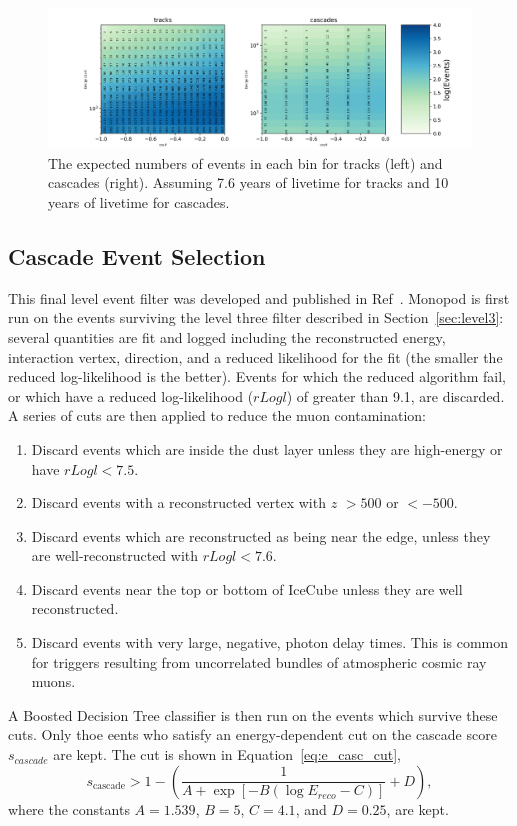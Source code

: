 \documentclass[main.tex]{subfiles}
\begin{document}
\begin{figure}
    \centering
    \includegraphics[width=0.8\linewidth]{figures/realization_joint.png}
    \caption{The expected numbers of events in each bin for tracks (left) and cascades (right). Assuming 7.6 years of livetime for tracks and 10 years of livetime for cascades.}\label{fig:event_no}
\end{figure}

\subsection{Cascade Event Selection}

This final level event filter was developed and published in Ref~\cite{2018PhDT17N}.
Monopod is first run on the events surviving the level three filter described in Section~\ref{sec:level3}:
several quantities are fit and logged including the reconstructed energy, interaction vertex, direction, and a reduced likelihood for the fit (the smaller the reduced log-likelihood is the better).
Events for which the reduced algorithm fail, or which have a reduced log-likelihood ($rLogl$) of greater than 9.1, are discarded. 
A series of cuts are then applied to reduce the muon contamination: 
\begin{enumerate}
    \item Discard events which are inside the dust layer unless they are high-energy or have $rLogl<7.5$. 
    \item Discard events with a reconstructed vertex with $z$ $>500$ or $<-500$. 
    \item Discard events which are reconstructed as being near the edge, unless they are well-reconstructed with $rLogl<7.6$.
    \item Discard events near the top or bottom of IceCube unless they are well reconstructed. 
    \item Discard events with very large, negative, photon delay times. This is common for triggers resulting from uncorrelated bundles of atmospheric cosmic ray muons. 
\end{enumerate}
A Boosted Decision Tree classifier is then run on the events which survive these cuts.  
Only thoe eents who satisfy an energy-dependent cut on the cascade score $s_{cascade}$ are kept. The cut is shown in Equation~\eqref{eq:e_casc_cut},
\begin{equation}
    s_{\text{cascade}} > 1 - \left(\dfrac{1}{A + \exp\left[ -B(\log E_{reco} - C) \right]} + D\right),
\end{equation}\label{eq:e_casc_cut}
where the constants $A=1.539$, $B=5$, $C=4.1$, and $D=0.25$, are kept. 
\end{document}
